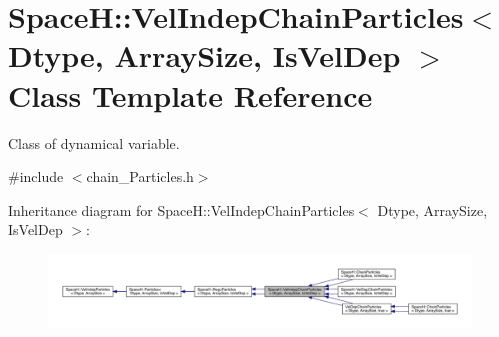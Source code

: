 \hypertarget{class_space_h_1_1_vel_indep_chain_particles}{}\section{SpaceH\+:\+:Vel\+Indep\+Chain\+Particles$<$ Dtype, Array\+Size, Is\+Vel\+Dep $>$ Class Template Reference}
\label{class_space_h_1_1_vel_indep_chain_particles}


Class of dynamical variable.  




{\ttfamily \#include $<$chain_\+Particles.\+h$>$}



Inheritance diagram for SpaceH\+:\+:Vel\+Indep\+Chain\+Particles$<$ Dtype, Array\+Size, Is\+Vel\+Dep $>$\+:
\nopagebreak
\begin{figure}[H]
\begin{center}
\leavevmode
\includegraphics[width=350pt]{class_space_h_1_1_vel_indep_chain_particles__inherit__graph}
\end{center}
\end{figure}


